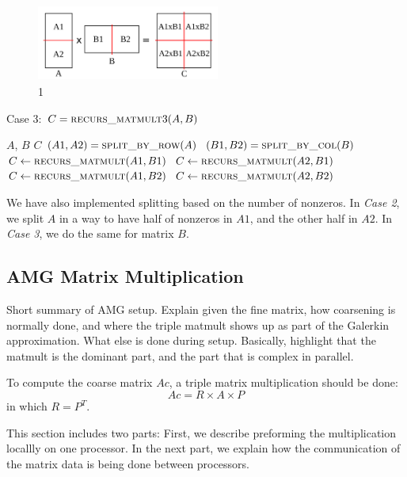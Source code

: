 \begin{figure}[tbh]
 \centering
 \includegraphics[width=6cm,height=2.5cm]{./figures/case3_001.pdf}
 \caption{1}
 \label{fig:case3}
\end{figure}

\begin{algorithm}[H] 
  \caption{Case 3: $C = \textsc{recurs\_matmult}3(A, B)$} \label{alg:case3} 
  \begin{algorithmic}[1]
    \Require $A$, $B$
    \Ensure  $C$
    \State $(A1, A2) = \textsc{split\_by\_row}(A)$
    \State $(B1, B2) = \textsc{split\_by\_col}(B)$
    \State $C \leftarrow \textsc{recurs\_matmult}(A1,B1)$
    \State $C \leftarrow \textsc{recurs\_matmult}(A2,B1)$
    \State $C \leftarrow \textsc{recurs\_matmult}(A1,B2)$
    \State $C \leftarrow \textsc{recurs\_matmult}(A2,B2)$
  \end{algorithmic}
\end{algorithm}

We have also implemented splitting based on the number of nonzeros. In \textit{Case 2}, we split $A$ in a way to have half of nonzeros in $A1$, and the other half in $A2$. In \textit{Case 3}, we do the same for matrix $B$.


\subsection{AMG Matrix Multiplication}
\label{sec:amg}

Short summary of AMG setup. Explain given the fine matrix, how coarsening is normally done, and where the triple matmult shows up as part of the Galerkin approximation. What else is done during setup. Basically, highlight that the matmult is the dominant part, and the part that is complex in parallel. 

To compute the coarse matrix $Ac$, a triple matrix multiplication should be done:
\begin{equation}
 Ac = R \times A \times P
\end{equation}
in which $R = P^T$.

This section includes two parts: First, we describe preforming the multiplication locallly on one processor. In the next part, we explain how the communication of the matrix data is being done between processors.

